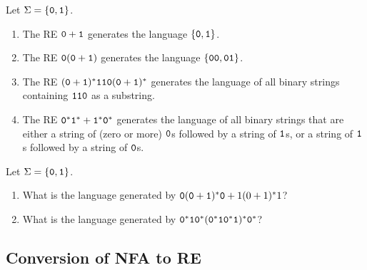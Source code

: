 \begin{Example} Let $\Sigma = \{\texttt 0, \texttt 1\}$.
\begin{enumerate}
\item The RE $\texttt 0 + \texttt 1$ generates the language $\{\texttt 0, \texttt 1\}$.
\item The RE $\texttt 0(\texttt 0 + \texttt 1)$ generates the language $\{\texttt{00}, \texttt{01}\}$.
\item The RE $(\texttt 0 + \texttt 1)^*\texttt{110}(\texttt 0 + \texttt 1)^*$ generates the language of all binary strings containing $\texttt{110}$ as a substring.
\item The RE $\texttt 0^* \texttt 1^* + \texttt 1^* \texttt 0^*$ generates the language of all binary strings that are either a string of (zero or more) $\texttt 0$s followed by a string of $\texttt 1$s, or a string of $\texttt 1$s followed by a string of $\texttt 0$s.
\end{enumerate}
\end{Example}

\begin{Exercise} Let $\Sigma = \{\texttt 0, \texttt 1\}$.
\begin{enumerate}
\item What is the language generated by $\texttt 0 (\texttt 0 + \texttt 1)^* \texttt 0 + 1 (0 + 1)^* 1$?
\item What is the language generated by $\texttt 0^* \texttt 1 \texttt 0^*(\texttt 0^* \texttt 1 \texttt 0^* \texttt 1)^* \texttt 0^*$?
\end{enumerate}
\end{Exercise}


\subsection{Conversion of NFA to RE}\label{subsec:NFAtoRE}

